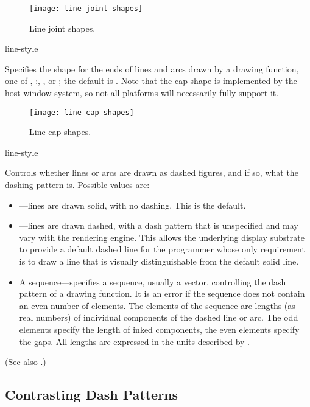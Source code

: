 \begin{figure}
\centerline{\texttt{[image: line-joint-shapes]}}
\caption{Line joint shapes.}
\end{figure}

 {line-style}

Specifies the shape for the ends of lines and arcs drawn by a drawing function,
one of , :, , or ; the default
is .  Note that the cap shape is implemented by the host window
system, so not all platforms will necessarily fully support it.

\begin{figure}
\centerline{\texttt{[image: line-cap-shapes]}}
\caption{Line cap shapes.}
\end{figure}

 {line-style}

Controls whether lines or arcs are drawn as dashed figures, and if so, what the
dashing pattern is.  Possible values are:

\begin{itemize}
\item {}---lines are drawn solid, with no dashing.  This is the default.

\item {}---lines are drawn dashed, with a dash pattern that is unspecified
and may vary with the rendering engine.  This allows the underlying display
substrate to provide a default dashed line for the programmer whose only
requirement is to draw a line that is visually distinguishable from the default
solid line.

\item A sequence---specifies a sequence, usually a vector, controlling the dash
pattern of a drawing function.  It is an error if the sequence does not contain
an even number of elements.  The elements of the sequence are lengths (as real
numbers) of individual components of the dashed line or arc.  The odd elements
specify the length of inked components, the even elements specify the gaps.  All
lengths are expressed in the units described by .
\end{itemize}

(See also .)

\subsection {Contrasting Dash Patterns}

